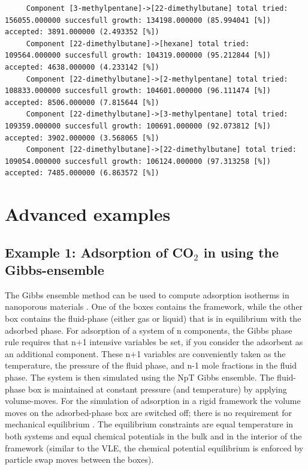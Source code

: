 \begin{tiny}
\begin{verbatim}
     Component [3-methylpentane]->[22-dimethylbutane] total tried: 156055.000000 succesfull growth: 134198.000000 (85.994041 [%]) accepted: 3891.000000 (2.493352 [%])
     Component [22-dimethylbutane]->[hexane] total tried: 109564.000000 succesfull growth: 104319.000000 (95.212844 [%]) accepted: 4638.000000 (4.233142 [%])
     Component [22-dimethylbutane]->[2-methylpentane] total tried: 108833.000000 succesfull growth: 104601.000000 (96.111474 [%]) accepted: 8506.000000 (7.815644 [%])
     Component [22-dimethylbutane]->[3-methylpentane] total tried: 109359.000000 succesfull growth: 100691.000000 (92.073812 [%]) accepted: 3902.000000 (3.568065 [%])
     Component [22-dimethylbutane]->[22-dimethylbutane] total tried: 109054.000000 succesfull growth: 106124.000000 (97.313258 [%]) accepted: 7485.000000 (6.863572 [%])
\end{verbatim}
\end{tiny}

\section{Advanced examples}

\subsection*{Example 1: Adsorption of CO$_2$ in using the Gibbs-ensemble}

The Gibbs ensemble method can be used to compute adsorption isotherms in nanoporous materials \cite{Panagiotopoulos1987,McGrother1999}.
One of the boxes contains the framework, while the other box contains the fluid-phase
(either gas or liquid) that is in equilibrium with the adsorbed phase.
For adsorption of a system of n components, the Gibbs phase rule requires that n+1 intensive variables be set,
if you consider the adsorbent as an additional component.  These n+1 variables are conveniently taken as the
temperature, the pressure of the fluid phase, and n-1 mole fractions in the fluid phase.
The system is then simulated using the NpT Gibbs ensemble.
The fluid-phase box is maintained at constant pressure (and temperature) by applying volume-moves.
For the simulation of adsorption in a rigid framework the volume
moves on the adsorbed-phase box are switched off; there is no requirement for mechanical equilibrium \cite{Panagiotopoulos1987}.
The equilibrium constraints are equal temperature in both systems and equal chemical potentials
in the bulk and in the interior of the framework (similar to the VLE, the chemical potential equilibrium is
enforced by particle swap moves between the boxes).

